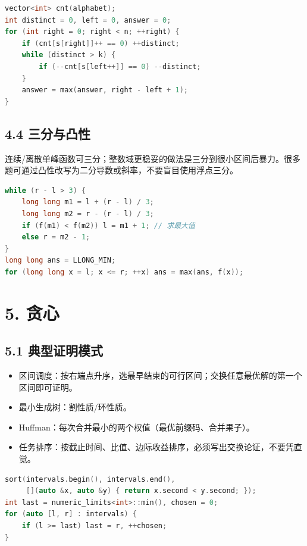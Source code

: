 \begin{lstlisting}[language={C++}]
vector<int> cnt(alphabet);
int distinct = 0, left = 0, answer = 0;
for (int right = 0; right < n; ++right) {
    if (cnt[s[right]]++ == 0) ++distinct;
    while (distinct > k) {
        if (--cnt[s[left++]] == 0) --distinct;
    }
    answer = max(answer, right - left + 1);
}
\end{lstlisting}

\subsection{4.4 三分与凸性}\label{ux4e09ux5206ux4e0eux51f8ux6027}

连续/离散单峰函数可三分；整数域更稳妥的做法是三分到很小区间后暴力。很多题可通过凸性改写为二分导数或斜率，不要盲目使用浮点三分。

\begin{lstlisting}[language={C++}]
while (r - l > 3) {
    long long m1 = l + (r - l) / 3;
    long long m2 = r - (r - l) / 3;
    if (f(m1) < f(m2)) l = m1 + 1; // 求最大值
    else r = m2 - 1;
}
long long ans = LLONG_MIN;
for (long long x = l; x <= r; ++x) ans = max(ans, f(x));
\end{lstlisting}

\section{5. 贪心}\label{ux8d2aux5fc3}

\subsection{5.1 典型证明模式}\label{ux5178ux578bux8bc1ux660eux6a21ux5f0f}

\begin{itemize}
\tightlist
\item
  区间调度：按右端点升序，选最早结束的可行区间；交换任意最优解的第一个区间即可证明。
\item
  最小生成树：割性质/环性质。
\item
  Huffman：每次合并最小的两个权值（最优前缀码、合并果子）。
\item
  任务排序：按截止时间、比值、边际收益排序，必须写出交换论证，不要凭直觉。
\end{itemize}

\begin{lstlisting}[language={C++}]
sort(intervals.begin(), intervals.end(),
     [](auto &x, auto &y) { return x.second < y.second; });
int last = numeric_limits<int>::min(), chosen = 0;
for (auto [l, r] : intervals) {
    if (l >= last) last = r, ++chosen;
}
\end{lstlisting}

